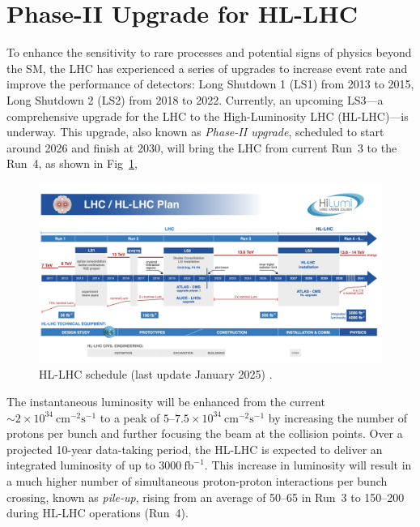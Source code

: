 \section{Phase-II Upgrade for HL-LHC} \label{sec:upgrade}
To enhance the sensitivity to rare processes and potential signs of physics beyond the SM, the LHC has experienced a series of upgrades to increase event rate and improve the performance of detectors: Long Shutdown 1 (LS1) from 2013 to 2015, Long Shutdown 2 (LS2) from 2018 to 2022. Currently, an upcoming LS3---a comprehensive upgrade for the LHC to the High-Luminosity LHC (HL-LHC)---is underway. This upgrade, also known as \textit{Phase-II upgrade}, scheduled to start around 2026 and finish at 2030, will bring the LHC from current Run~3 to the Run~4, as shown in Fig~\ref{fig:HL-LHC},

\begin{figure}[htbp]
  \centering
  \includegraphics[width=1.0\textwidth]{figs/chapter1/HL-LHC_plan.png}
  \caption{HL-LHC schedule (last update January 2025) \cite{HL-LHC}.}
  \label{fig:HL-LHC}
\end{figure}

The instantaneous luminosity will be enhanced from the current $\sim 2 \times 10^{34}~\mathrm{cm}^{-2}\mathrm{s}^{-1}$ to a peak of $5$–$7.5 \times 10^{34}~\mathrm{cm}^{-2}\mathrm{s}^{-1}$ by increasing the number of protons per bunch and further focusing the beam at the collision points. Over a projected 10-year data-taking period, the HL-LHC is expected to deliver an integrated luminosity of up to $3000~\mathrm{fb}^{-1}$. This increase in luminosity will result in a much higher number of simultaneous proton-proton interactions per bunch crossing, known as \textit{pile-up}, rising from an average of 50–65 in Run~3 to 150–200 during HL-LHC operations (Run~4).

